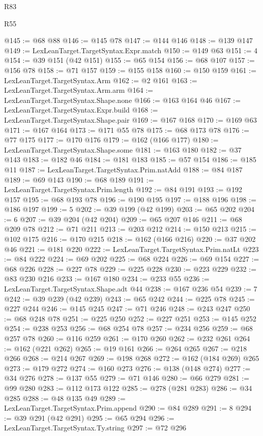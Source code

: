 \begin{lexlean}{R83}
\begin{lexlean}{R55}
\begin{coremodule}
{{{{{{{{{{{{{{{{{{{{{{{{{{{{{{{{{{{{{{{{{{{{{{{{{{{{{{{{{{{{@145 := @68 @88
@146 := @145 @78
@147 := @144 @146
@148 := @139 @147
@149 := LexLeanTarget.TargetSyntax.Expr.match
@150 := @149 @63
@151 := 4
@154 := @39 @151 (@42 @151)
@155 := @65 @154
@156 := @68 @107
@157 := @156 @78
@158 := @71 @157
@159 := @155 @158
@160 := @150 @159
@161 := LexLeanTarget.TargetSyntax.Arm
@162 := @2 @161
@163 := LexLeanTarget.TargetSyntax.Arm.arm
@164 := LexLeanTarget.TargetSyntax.Shape.none
@166 := @163 @164 @46
@167 := LexLeanTarget.TargetSyntax.Expr.build
@168 := LexLeanTarget.TargetSyntax.Shape.pair
@169 := @167 @168
@170 := @169 @63
@171 := @167 @164
@173 := @171 @55 @78
@175 := @68 @173 @78
@176 := @77 @175
@177 := @170 @176
@179 := @162 (@166 @177)
@180 := LexLeanTarget.TargetSyntax.Shape.some
@181 := @163 @180
@182 := @37 @143
@183 := @182 @46
@184 := @181 @183
@185 := @57 @154
@186 := @185 @11
@187 := LexLeanTarget.TargetSyntax.Prim.natAdd
@188 := @84 @187
@189 := @69 @143
@190 := @68 @189
@191 := LexLeanTarget.TargetSyntax.Prim.length
@192 := @84 @191
@193 := @192 @157
@195 := @68 @193 @78
@196 := @190 @195
@197 := @188 @196
@198 := @186 @197
@199 := 5
@202 := @39 @199 (@42 @199)
@203 := @65 @202
@204 := 6
@207 := @39 @204 (@42 @204)
@209 := @65 @207 @146
@211 := @68 @209 @78
@212 := @71 @211
@213 := @203 @212
@214 := @150 @213
@215 := @102 @175
@216 := @170 @215
@218 := @162 (@166 @216)
@220 := @37 @202 @46
@221 := @181 @220
@222 := LexLeanTarget.TargetSyntax.Prim.natLt
@223 := @84 @222
@224 := @69 @202
@225 := @68 @224
@226 := @69 @154
@227 := @68 @226
@228 := @227 @78
@229 := @225 @228
@230 := @223 @229
@232 := @83 @230 @216
@233 := @167 @180
@234 := @233 @55
@236 := LexLeanTarget.TargetSyntax.Shape.adt @44
@238 := @167 @236 @54
@239 := 7
@242 := @39 @239 (@42 @239)
@243 := @65 @242
@244 := @225 @78
@245 := @227 @244
@246 := @145 @245
@247 := @71 @246
@248 := @243 @247
@250 := @68 @248 @78
@251 := @225 @250
@252 := @227 @251
@253 := @145 @252
@254 := @238 @253
@256 := @68 @254 @78
@257 := @234 @256
@259 := @68 @257 @78
@260 := @116 @259
@261 := @170 @260
@262 := @232 @261
@264 := @162 (@221 @262)
@265 := @19 @161
@266 := @264 @265
@267 := @218 @266
@268 := @214 @267
@269 := @198 @268
@272 := @162 (@184 @269) @265
@273 := @179 @272
@274 := @160 @273
@276 := @138 (@148 @274)
@277 := @34 @276
@278 := @137 @55
@279 := @71 @146
@280 := @66 @279
@281 := @99 @280
@283 := @112 @173 @122
@285 := @278 (@281 @283)
@286 := @34 @285
@288 := @48 @135 @49
@289 := LexLeanTarget.TargetSyntax.Prim.append
@290 := @84 @289
@291 := 8
@294 := @39 @291 (@42 @291)
@295 := @65 @294
@296 := LexLeanTarget.TargetSyntax.Ty.string
@297 := @72 @296
}}}}}}}}}}}}}}}}}}}}}}}}}}}}}}}}}}}}}}}}}}}}}}}}}}}}}}}}}}}}
\end{coremodule}
\end{lexlean}
\end{lexlean}

